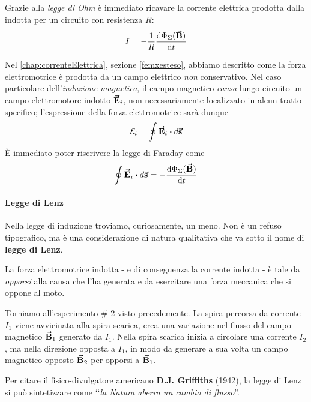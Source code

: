 Grazie alla \textit{legge di Ohm} è immediato ricavare la corrente elettrica prodotta dalla \fem indotta per un circuito con resistenza $R$:
\begin{equation}
	I=-\frac{1}{R}\dv{\Phi_\Sigma(\vb*{\va{B}})}{t}
\end{equation}

\begin{observe} %
	Nel \autoref{chap:correnteElettrica}, sezione \ref{femxesteso}, abbiamo descritto come la forza elettromotrice è prodotta da un campo elettrico \textit{non} conservativo. Nel caso particolare dell'\textit{induzione magnetica}, il campo magnetico \textit{causa} lungo circuito un campo elettromotore indotto $\vb*{\va{E}}_i$, non necessariamente localizzato in alcun tratto specifico; l'espressione della forza elettromotrice sarà dunque
	\begin{equation*}
		\mathcal{E}_i=\oint\vba{E}_i\vdot d\vba{s}
	\end{equation*}
	È immediato poter riscrivere la legge di Faraday come
	\begin{equation}
		\oint \vba E_i\vdot d\vba s =-\dv{\Phi_{\Sigma}(\vba B)}{t}		
	\end{equation}
\end{observe}
\paragraph{Legge di Lenz}
Nella legge di induzione troviamo, curiosamente, un meno. Non è un refuso tipografico, ma è una considerazione di natura qualitativa che va sotto il nome di \textbf{legge di Lenz}.
\begin{corollaryqed}
	La forza elettromotrice indotta - e di conseguenza la corrente indotta - è tale da \textit{opporsi} alla causa che l'ha generata e da esercitare una forza meccanica che si oppone al moto. 
\end{corollaryqed}
\begin{observe}
	Torniamo all'esperimento \# 2 visto precedemente. La spira percorsa da corrente $I_1$ viene avvicinata alla spira scarica, crea una variazione nel flusso del campo magnetico $\vb*{\va{B}}_1$ generato da $I_1$. Nella spira scarica inizia a circolare una corrente $I_2$, ma nella direzione opposta a $I_1$, in modo da generare a sua volta un campo magnetico opposto $\vb*{\va{B}}_2$ per opporsi a $\vb*{\va{B}}_1$.  
\end{observe}
Per citare il fisico-divulgatore americano \textbf{D.J. Griffiths} (1942), la legge di Lenz si può sintetizzare come ‘‘\textit{la Natura aberra un cambio di flusso}''.
